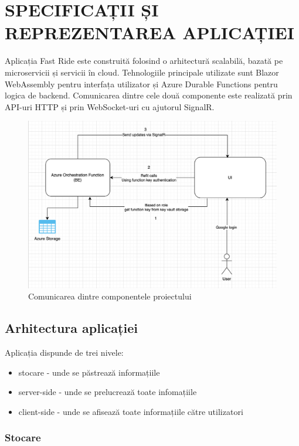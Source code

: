 \chapter{SPECIFICAȚII ȘI REPREZENTAREA APLICAȚIEI}
Aplicația Fast Ride este construită folosind o arhitectură scalabilă, bazată pe microservicii și servicii în cloud. Tehnologiile principale utilizate sunt Blazor WebAssembly pentru interfața utilizator și Azure Durable Functions pentru logica de backend. Comunicarea dintre cele două componente este realizată prin API-uri HTTP și prin WebSocket-uri cu ajutorul SignalR.
\begin{figure}[H]
    \centering
    \includegraphics[width=14cm]{Assets/componentsComunication.png}
    \caption{Comunicarea dintre componentele proiectului}
    \label{fig:componentsComunication}
\end{figure}

\section{Arhitectura aplicației}
Aplicația dispunde de trei nivele:
\begin{itemize}
    \item stocare - unde se păstrează informațiile
    \item server-side - unde se prelucrează toate infomațiile
    \item client-side - unde se afisează toate informațiile către utilizatori
\end{itemize}

\subsection{Stocare}

